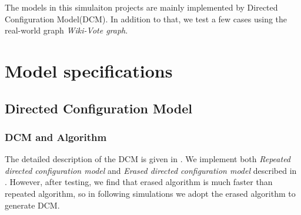 \documentclass{article}
\begin{document}
The models in this simulaiton projects are mainly implemented by Directed Configuration Model(DCM). In addition to that, we test a few cases using the real-world graph \emph{Wiki-Vote graph}.\\

\section{Model specifications}
	\subsection{Directed Configuration Model}
		
		\subsubsection{DCM and Algorithm} 
\par The detailed description of the DCM is given in \cite{algo}. We implement both \emph{Repeated directed configuration model} and \emph{Erased directed configuration model} described in \cite{algo}. However, after testing, we find that erased algorithm is much faster than repeated algorithm, so in following simulations we adopt the erased algorithm to generate DCM.
\end{document}

